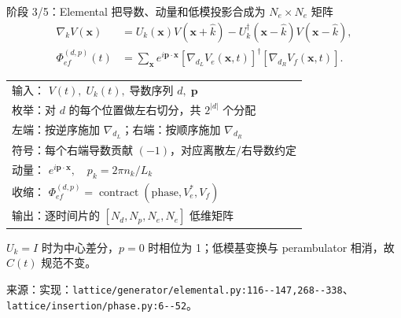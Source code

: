 \documentclass[UTF8,aspectratio=169,11pt]{ctexbeamer}
\newcommand{\source}[1]{%
  \vspace{0.06em}\par{\raggedright\scriptsize\color{muted}来源：#1\par}}
\newcommand{\codepath}[1]{\nolinkurl{#1}}
\begin{document}
\begin{frame}[t]{阶段 3/5：Elemental 把导数、动量和低模投影合成为 $N_e\times N_e$ 矩阵}
  \centering
  \begin{align*}
    \nabla_k V(\boldsymbol x)&=U_k(\boldsymbol x)V(\boldsymbol x+\hat k)
      -U_k^\dagger(\boldsymbol x-\hat k)V(\boldsymbol x-\hat k),\\
    \Phi^{(d,p)}_{ef}(t)&=\sum_{\boldsymbol x}e^{i\boldsymbol p\cdot\boldsymbol x}
      \left[\nabla_{d_L}V_e(\boldsymbol x,t)\right]^\dagger
      \left[\nabla_{d_R}V_f(\boldsymbol x,t)\right].
  \end{align*}
  \vspace{-0.04cm}
  \begin{tabular}{@{}l@{}}
    $\text{输入： }V(t),\;U_k(t),\;\text{导数序列 }d,\;\boldsymbol p$ \\
    $\text{枚举：对 }d\text{ 的每个位置做左右切分，共 }2^{|d|}\text{ 个分配}$ \\
    $\text{左端：按逆序施加 }\nabla_{d_L}\text{；右端：按顺序施加 }\nabla_{d_R}$ \\
    $\text{符号：每个右端导数贡献 }(-1)\text{，对应离散左/右导数约定}$ \\
    $\text{动量： }e^{i\boldsymbol p\cdot\boldsymbol x},\quad p_k=2\pi n_k/L_k$ \\
    $\text{收缩： }\Phi^{(d,p)}_{ef}=\operatorname{contract}(\text{phase},V_e^\ast,V_f)$ \\
    $\text{输出：逐时间片的 }[N_d,N_p,N_e,N_e]\text{ 低维矩阵}$ \\
  \end{tabular}
  \vspace{0.02cm}
  \begin{center}
    \small\textcolor{muted}{$U_k=I$ 时为中心差分，$p=0$ 时相位为 1；低模基变换与 perambulator 相消，故 $C(t)$ 规范不变。}
  \end{center}
  \source{实现：\codepath{lattice/generator/elemental.py:116--147,268--338}、\codepath{lattice/insertion/phase.py:6--52}。}
\end{frame}
\end{document}
